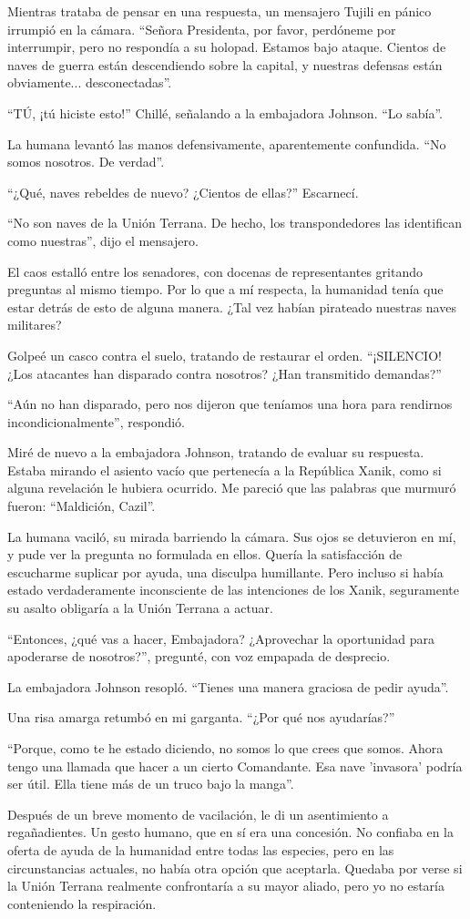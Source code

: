 \documentclass[spanish,12pt,a4paper,oneside,titlepage]{book}
\begin{document}
    Mientras trataba de pensar en una respuesta, un mensajero Tujili en pánico irrumpió en la cámara. ``Señora Presidenta, por favor, perdóneme por interrumpir, pero no respondía a su holopad. Estamos bajo ataque. Cientos de naves de guerra están descendiendo sobre la capital, y nuestras defensas están obviamente... desconectadas''.

    ``TÚ, ¡tú hiciste esto!'' Chillé, señalando a la embajadora Johnson. ``Lo sabía''.

    La humana levantó las manos defensivamente, aparentemente confundida. ``No somos nosotros. De verdad''.

    ``¿Qué, naves rebeldes de nuevo? ¿Cientos de ellas?'' Escarnecí.

    ``No son naves de la Unión Terrana. De hecho, los transpondedores las identifican como nuestras'', dijo el mensajero.

    El caos estalló entre los senadores, con docenas de representantes gritando preguntas al mismo tiempo. Por lo que a mí respecta, la humanidad tenía que estar detrás de esto de alguna manera. ¿Tal vez habían pirateado nuestras naves militares?

    Golpeé un casco contra el suelo, tratando de restaurar el orden. ``¡SILENCIO! ¿Los atacantes han disparado contra nosotros? ¿Han transmitido demandas?''

    ``Aún no han disparado, pero nos dijeron que teníamos una hora para rendirnos incondicionalmente'', respondió.

    Miré de nuevo a la embajadora Johnson, tratando de evaluar su respuesta. Estaba mirando el asiento vacío que pertenecía a la República Xanik, como si alguna revelación le hubiera ocurrido. Me pareció que las palabras que murmuró fueron: ``Maldición, Cazil''.

    La humana vaciló, su mirada barriendo la cámara. Sus ojos se detuvieron en mí, y pude ver la pregunta no formulada en ellos. Quería la satisfacción de escucharme suplicar por ayuda, una disculpa humillante. Pero incluso si había estado verdaderamente inconsciente de las intenciones de los Xanik, seguramente su asalto obligaría a la Unión Terrana a actuar.

    ``Entonces, ¿qué vas a hacer, Embajadora? ¿Aprovechar la oportunidad para apoderarse de nosotros?'', pregunté, con voz empapada de desprecio.

    La embajadora Johnson resopló. ``Tienes una manera graciosa de pedir ayuda''.

    Una risa amarga retumbó en mi garganta. ``¿Por qué nos ayudarías?''

    ``Porque, como te he estado diciendo, no somos lo que crees que somos. Ahora tengo una llamada que hacer a un cierto Comandante. Esa nave 'invasora' podría ser útil. Ella tiene más de un truco bajo la manga''.

    Después de un breve momento de vacilación, le di un asentimiento a regañadientes. Un gesto humano, que en sí era una concesión. No confiaba en la oferta de ayuda de la humanidad entre todas las especies, pero en las circunstancias actuales, no había otra opción que aceptarla. Quedaba por verse si la Unión Terrana realmente confrontaría a su mayor aliado, pero yo no estaría conteniendo la respiración.
\end{document}
